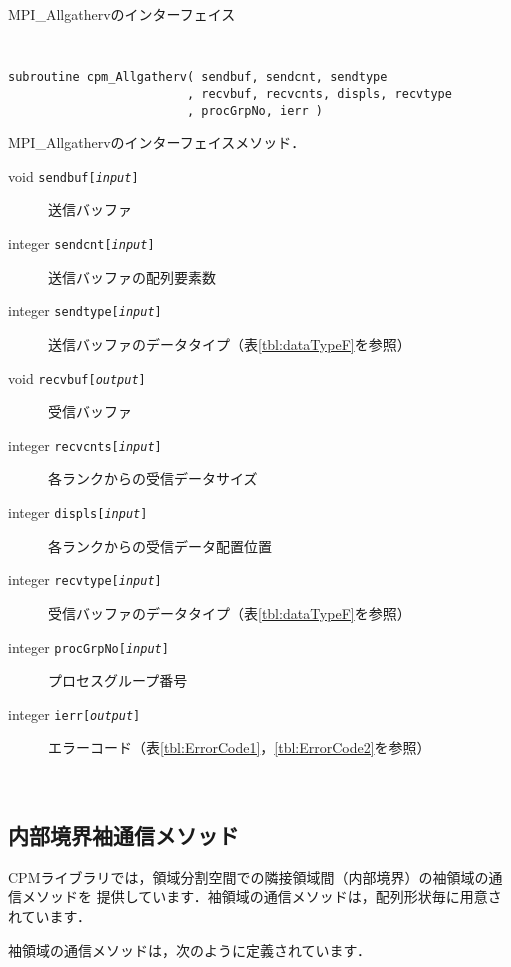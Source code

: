 \begin{spacing}{0.8}
\begin{itembox}[l]{MPI\_Allgathervのインターフェイス}
{\tt
\begin{verbatim}
subroutine cpm_Allgatherv( sendbuf, sendcnt, sendtype
                         , recvbuf, recvcnts, displs, recvtype
                         , procGrpNo, ierr )
\end{verbatim}
}
MPI\_Allgathervのインターフェイスメソッド．
\begin{description}
\item[void    {\tt sendbuf[{\it input}]}] 送信バッファ
\item[integer {\tt sendcnt[{\it input}]}] 送信バッファの配列要素数
\item[integer {\tt sendtype[{\it input}]}] 送信バッファのデータタイプ（表\ref{tbl:dataTypeF}を参照）
\item[void    {\tt recvbuf[{\it output}]}] 受信バッファ
\item[integer {\tt recvcnts[{\it input}]}] 各ランクからの受信データサイズ
\item[integer {\tt displs[{\it input}]}] 各ランクからの受信データ配置位置
\item[integer {\tt recvtype[{\it input}]}] 受信バッファのデータタイプ（表\ref{tbl:dataTypeF}を参照）
\item[integer {\tt procGrpNo[{\it input}]}] プロセスグループ番号
\item[integer {\tt ierr[{\it output}]}] エラーコード（表\ref{tbl:ErrorCode1}，\ref{tbl:ErrorCode2}を参照）
\end{description}
\end{itembox}\\
\end{spacing}


\clearpage


\subsection{内部境界袖通信メソッド}
\label{bndcommF}
CPMライブラリでは，領域分割空間での隣接領域間（内部境界）の袖領域の通信メソッドを
提供しています．袖領域の通信メソッドは，配列形状毎に用意されています．

袖領域の通信メソッドは，次のように定義されています．\\

